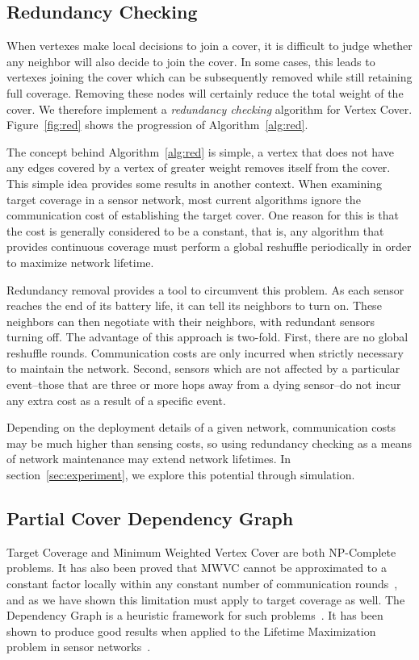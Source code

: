 \subsection{Redundancy Checking}

When vertexes make local decisions to join a cover, it is difficult to judge whether any neighbor will also decide to join the cover. In some cases, this leads to vertexes joining the cover which can be subsequently removed while still retaining full coverage. Removing these nodes will certainly reduce the total weight of the cover. We therefore implement a {\em redundancy checking} algorithm for Vertex Cover. Figure~\ref{fig:red} shows the progression of Algorithm~\ref{alg:red}.

 



The concept behind Algorithm~\ref{alg:red} is simple, a vertex that does not have any edges covered by a vertex of greater weight removes itself from the cover. This simple idea provides some results in another context. When examining target coverage in a sensor network, most current algorithms ignore the communication cost of establishing the target cover\cite{1514028}. One reason for this is that the cost is generally considered to be a constant, that is, any algorithm that provides continuous coverage must perform a global reshuffle periodically in order to maximize network lifetime. 

Redundancy removal provides a tool to circumvent this problem. As each sensor reaches the end of its battery life, it can tell its neighbors to turn on. These neighbors can then negotiate with their neighbors, with redundant sensors turning off. The advantage of this approach is two-fold. First, there are no global reshuffle rounds. Communication costs are only incurred when strictly necessary to maintain the network. Second, sensors which are not affected by a particular event--those that are three or more hops away from a dying sensor--do not incur any extra cost as a result of a specific event.

Depending on the deployment details of a given network, communication costs may be much higher than sensing costs, so using redundancy checking as a means of network maintenance may extend network lifetimes. In section~\ref{sec:experiment}, we explore this potential through simulation.


\subsection{Partial Cover Dependency Graph}
\label{sec:life-depend}
Target Coverage and Minimum Weighted Vertex Cover are both NP-Complete problems. It has also been proved that MWVC cannot be approximated to a constant factor locally within any constant number of communication rounds~\cite{1011811}, and as we have shown this limitation must apply to target coverage as well. The Dependency Graph is a heuristic framework for such problems~\cite{IPDPS.2008.45361}. It has been shown to produce good results when applied to the Lifetime Maximization problem in sensor networks~\cite{978-3-540-89894-8_26}.

